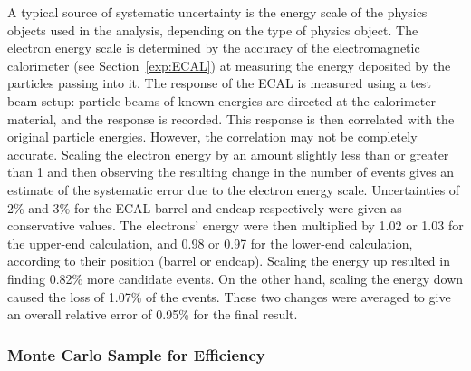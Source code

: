 
A typical source of systematic uncertainty 
is the energy scale of the physics objects 
used in the analysis, 
depending on the type of physics object.  
The electron energy scale is determined 
by the accuracy of the electromagnetic 
calorimeter (see Section~\ref{exp:ECAL})
at measuring the energy 
deposited by the particles passing into it.  
The response of the ECAL is measured 
using a test beam setup: 
particle beams of known energies are 
directed at the calorimeter material, 
and the response is recorded.  
This response is then correlated with the 
original particle energies.  
However, the correlation may not be completely 
accurate.  
Scaling the electron energy by an amount 
slightly less than or greater than 1 
and then observing the resulting change 
in the number of \Zee events 
gives an estimate of the systematic error 
due to the electron energy scale.  
Uncertainties of 2\% and 3\% %
for the ECAL barrel and endcap respectively 
were given as conservative values.  
The electrons' energy were then multiplied 
by 1.02 or 1.03 for the upper-end calculation, 
and 0.98 or 0.97 for the lower-end calculation, 
according to their position (barrel or endcap).  
Scaling the energy up resulted in finding 
0.82\% more \Zee candidate events.  
On the other hand, scaling the energy down 
caused the loss of 1.07\% of the events.  
These two changes were averaged 
to give an overall relative error 
of 0.95\% for the final result.  

\subsubsection{Monte Carlo Sample for Efficiency}
\label{anMeth:SystsOtherMCEff}


